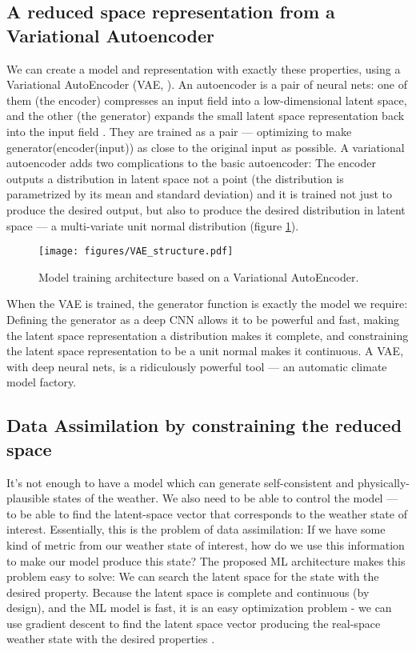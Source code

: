 \documentclass[gmd]{copernicus}
\begin{document}
    
\subsection{A reduced space representation from a Variational Autoencoder}

We can create a model and representation with exactly these properties, using a Variational AutoEncoder (VAE, \citet{VAE_Intro}). An autoencoder is a pair of neural nets: one of them (the encoder) compresses an input field into a low-dimensional latent space, and the other (the generator) expands the small latent space representation back into the input field \citep{Autoencoder}. They are trained as a pair --- optimizing to make generator(encoder(input)) as close to the original input as possible. A variational autoencoder adds two complications to the basic autoencoder: The encoder outputs a distribution in latent space not a point (the distribution is parametrized by its mean and standard deviation) and it is trained not just to produce the desired output, but also to produce the desired distribution in latent space  --- a multi-variate unit normal distribution (figure \ref{VAE_structure}).

\begin{figure}[h]
\texttt{[image: figures/VAE\_structure.pdf]}
\caption{Model training architecture based on a Variational AutoEncoder.}
\label{VAE_structure}
\end{figure}

When the VAE is trained, the generator function is exactly the model we require: Defining the generator as a deep CNN allows it to be powerful and fast, making the latent space representation a distribution makes it complete, and constraining the latent space representation to be a unit normal makes it continuous. A VAE, with deep neural nets, is a ridiculously powerful tool --- an automatic climate model factory.
     
\subsection{Data Assimilation by constraining the reduced space}
\label{section_DA}

It's not enough to have a model which can generate self-consistent and physically-plausible states of the weather. We also need to be able to control the model --- to be able to find the latent-space vector that corresponds to the weather state of interest. Essentially, this is the problem of data assimilation: If we have some kind of metric from our weather state of interest, how do we use this information to make our model produce this state?
The proposed ML architecture makes this problem easy to solve: We can search the latent space for the state with the desired property. Because the latent space is complete and continuous (by design), and the ML model is fast, it is an easy optimization problem - we can use gradient descent to find the latent space vector producing the real-space weather state with the desired properties \citep{MLDA}.
\end{document}
